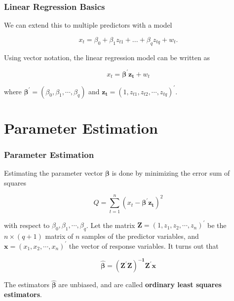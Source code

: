 \documentclass[%
xcolor=pdftex]{beamer}
\begin{document}
\begin{frame}
\frametitle{Linear Regression Basics}

We can extend this to multiple predictors with a model

\begin{equation*}
x_t= \beta_0 + \beta_1 z_{t1} +...+  \beta_q z_{tq} + w_t.
\end{equation*}

Using vector notation, the linear regression model can be written as

\begin{equation} \label{eq:full}
x_t=  \boldsymbol{\beta^{\prime}z_t} + w_t
\end{equation}

where $\boldsymbol{\beta^{\prime}} = (\beta_0,\beta_1,\cdots,\beta_q)$ and $\boldsymbol{z_t}=(1,z_{t1},z_{t2},\cdots,z_{tq})^{\prime}$.

\end{frame}

\section{Parameter Estimation}
\frame{\tableofcontents[currentsection]}

\begin{frame}
\frametitle{Parameter Estimation}

Estimating the parameter vector $\boldsymbol{\beta}$ is done by minimizing the error sum of squares

\begin{equation}
Q = \sum_{t=1}^{n}  ( x_t - \boldsymbol{\beta^{\prime}z_t})^2
\end{equation}

with respect to $\beta_0, \beta_1, \cdots, \beta_q$. Let the matrix $\boldsymbol{Z} = (1, z_{1},z_{2},\cdots,z_{n})^{\prime}$ be the $n \times (q+1)$ matrix of $n$ samples of the predictor variables, and $\boldsymbol{x} = (x_{1},x_{2},\cdots,x_{n})^{\prime}$ the vector of response variables. It turns out that

\begin{equation}
\boldsymbol{\hat{\beta}} = \boldsymbol{(Z^{\prime}Z)^{-1}Z^{\prime}x}
\end{equation}

The estimators $\boldsymbol{\hat{\beta}}$ are unbiased, and are called \textbf{ordinary least squares estimators}.

\end{frame}
\end{document}
